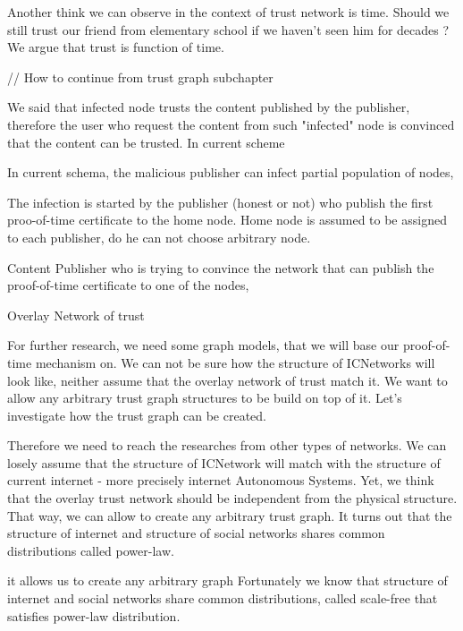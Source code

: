 \documentclass[nostrict]{szablonPG}
\begin{document}
Another think we can observe in the context of trust network is time. Should we still trust our friend from elementary school if we haven't seen him for decades ? We argue that trust is function of time.

// How to continue from trust graph subchapter 



We said that infected node trusts the content published by the publisher, therefore the user who request the content from such "infected" node is convinced that the content can be trusted. In current scheme 

In current schema, the malicious publisher can infect partial population of nodes, 



 The infection is started by the publisher (honest or not) who publish the first proo-of-time certificate to the home node. Home node is assumed to be assigned to each publisher, do he can not choose arbitrary node. 


Content Publisher who is trying to convince the network that can publish the proof-of-time certificate to one of the nodes, 

Overlay Network of trust

For further research, we need some graph models, that we will base our proof-of-time mechanism on. We can not be sure how the structure of ICNetworks will look like, neither assume that the overlay network of trust match it. We want to allow any arbitrary trust graph structures to be build on top of it. Let's investigate how the trust graph can be created. 

Therefore we need to reach the researches from other types of networks. We can losely assume that the structure of ICNetwork will match with the structure of current internet - more precisely internet Autonomous Systems. Yet, we think that the overlay trust network should be independent from the physical structure.  That way, we can allow to create any arbitrary trust graph. It turns out that the structure of internet and structure of social networks shares common distributions called power-law. 

it allows us to create any arbitrary graph  Fortunately we know that structure of internet and social networks share common distributions, called scale-free that satisfies power-law distribution. 




\end{document}
